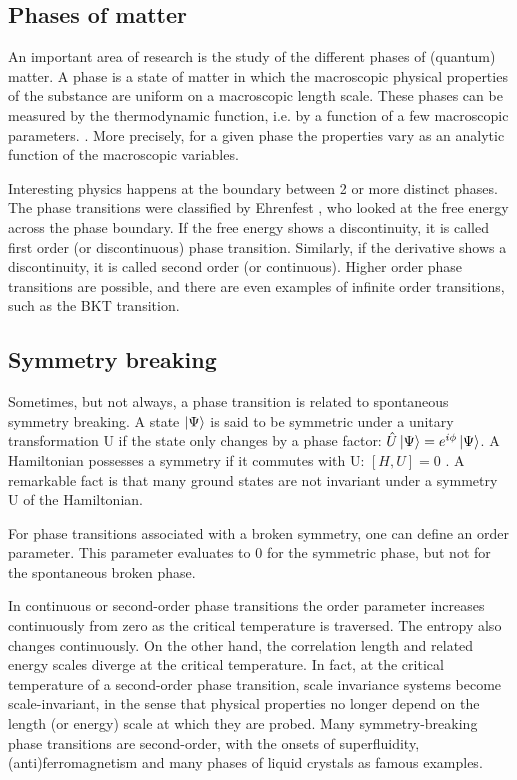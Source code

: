 \subsection{Phases of matter}

An important area of research is the study of the different phases of (quantum) matter. A phase is a state of matter in which the macroscopic physical properties of the substance are uniform on a macroscopic length scale. These phases can be measured by the thermodynamic function, i.e. by a function of a few macroscopic parameters. \cite{Nishimori2011}. More precisely, for a given phase the properties vary as an analytic function of the macroscopic variables.

Interesting physics happens at the boundary between 2 or more distinct phases. The phase transitions were classified by Ehrenfest \cite{Jaeger1998}, who looked at the free energy across the phase boundary. If the free energy shows a discontinuity, it is called first order (or discontinuous) phase transition. Similarly, if the derivative shows a discontinuity, it is called second order (or continuous). Higher order phase transitions are possible, and there are even examples of infinite order transitions, such as the BKT transition.

\subsection{Symmetry breaking}

Sometimes, but not always, a phase transition is  related to spontaneous symmetry breaking. A state $\ket{\Psi}$ is said to be symmetric under a unitary transformation U if the state only changes by a phase factor: $ \hat{U} \ket{\Psi} = e^{i \phi} \ket{\Psi} $. A Hamiltonian possesses a symmetry if it commutes with U: $ [H,U]=0$  \cite{Beekman2019}. A remarkable fact is that many ground states are not invariant under a symmetry U of the Hamiltonian.

For phase transitions associated with a broken symmetry, one can define an order parameter. This parameter evaluates to 0 for the symmetric phase, but not for the spontaneous broken phase.

In continuous or second-order phase transitions the order parameter increases continuously from zero as the critical temperature is traversed. The entropy also changes continuously. On the other hand, the correlation length and related energy scales diverge at the critical temperature. In fact, at the critical temperature of a second-order phase transition, scale invariance systems become scale-invariant, in the sense that physical properties no longer depend on the length (or energy) scale at which they are probed. Many symmetry-breaking phase transitions are second-order, with the onsets of superfluidity, (anti)ferromagnetism and many phases of liquid crystals as famous examples\cite{Beekman2019}.

